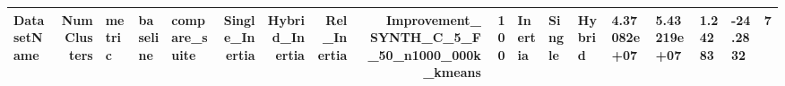 \begin{tabular}{lrlllrrrrr}
\toprule
DatasetName & NumClusters & metric & baseline & compare_suite & Single_Inertia & Hybrid_Inertia & Rel_Inertia & Improvement_%
\midrule
SYNTH_C_5_F_50_n1000_000k_kmeans & 100 & Inertia & Single & Hybrid & 4.37082e+07 & 5.43219e+07 & 1.24283 & -24.2832 & 7 \\
\bottomrule
\end{tabular}
